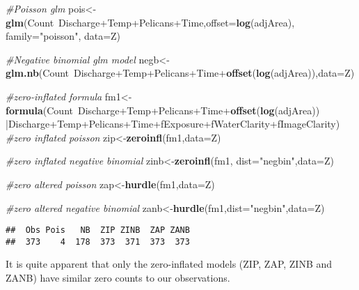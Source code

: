 \documentclass[]{article}
\newenvironment{Shaded}{\begin{snugshade}}{\end{snugshade}}
\newcommand{\KeywordTok}[1]{\textcolor[rgb]{0.13,0.29,0.53}{\textbf{{#1}}}}
\newcommand{\DataTypeTok}[1]{\textcolor[rgb]{0.13,0.29,0.53}{{#1}}}
\newcommand{\StringTok}[1]{\textcolor[rgb]{0.31,0.60,0.02}{{#1}}}
\newcommand{\CommentTok}[1]{\textcolor[rgb]{0.56,0.35,0.01}{\textit{{#1}}}}
\newcommand{\NormalTok}[1]{{#1}}
\begin{document}
\begin{Shaded}
\begin{Highlighting}[]
\CommentTok{#Poisson glm}
\NormalTok{pois<-}\KeywordTok{glm}\NormalTok{(Count~Discharge+Temp+Pelicans+Time,}\DataTypeTok{offset=}\KeywordTok{log}\NormalTok{(adjArea), }\DataTypeTok{family=}\StringTok{"poisson"}\NormalTok{, }\DataTypeTok{data=}\NormalTok{Z)}


\CommentTok{#Negative binomial glm model}
\NormalTok{negb<-}\KeywordTok{glm.nb}\NormalTok{(Count~Discharge+Temp+Pelicans+Time+}\KeywordTok{offset}\NormalTok{(}\KeywordTok{log}\NormalTok{(adjArea)),}\DataTypeTok{data=}\NormalTok{Z)}

\CommentTok{#zero-inflated formula}
\NormalTok{fm1<-}\KeywordTok{formula}\NormalTok{(Count~Discharge+Temp+Pelicans+Time+}\KeywordTok{offset}\NormalTok{(}\KeywordTok{log}\NormalTok{(adjArea))}
            \NormalTok{|Discharge+Temp+Pelicans+Time+fExposure+fWaterClarity+fImageClarity)}
\CommentTok{#zero inflated poisson}
\NormalTok{zip<-}\KeywordTok{zeroinfl}\NormalTok{(fm1,}\DataTypeTok{data=}\NormalTok{Z)}

\CommentTok{#zero inflated negative binomial}
\NormalTok{zinb<-}\KeywordTok{zeroinfl}\NormalTok{(fm1, }\DataTypeTok{dist=}\StringTok{"negbin"}\NormalTok{,}\DataTypeTok{data=}\NormalTok{Z)}

\CommentTok{#zero altered poisson}
\NormalTok{zap<-}\KeywordTok{hurdle}\NormalTok{(fm1,}\DataTypeTok{data=}\NormalTok{Z)}

\CommentTok{#zero altered negative binomial}
\NormalTok{zanb<-}\KeywordTok{hurdle}\NormalTok{(fm1,}\DataTypeTok{dist=}\StringTok{"negbin"}\NormalTok{,}\DataTypeTok{data=}\NormalTok{Z)}
\end{Highlighting}
\end{Shaded}

\begin{verbatim}
##  Obs Pois   NB  ZIP ZINB  ZAP ZANB 
##  373    4  178  373  371  373  373
\end{verbatim}

It is quite apparent that only the zero-inflated models (ZIP, ZAP, ZINB
and ZANB) have similar zero counts to our observations.
\end{document}
